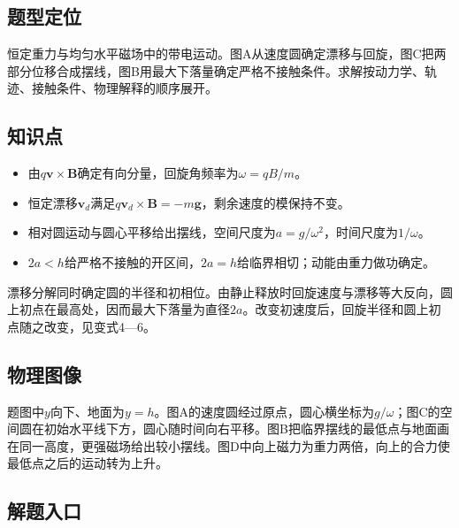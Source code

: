 \documentclass[UTF8,fontset=fandol,a4paper,11pt]{ctexart}
\begin{document}


\subsection*{题型定位}

恒定重力与均匀水平磁场中的带电运动。图A从速度圆确定漂移与回旋，图C把两部分位移合成摆线，图B用最大下落量确定严格不接触条件。求解按动力学、轨迹、接触条件、物理解释的顺序展开。



\subsection*{知识点}

\begin{itemize}
\item 由$q\boldsymbol v\times\boldsymbol B$确定有向分量，回旋角频率为$\omega=qB/m$。
\item 恒定漂移$\boldsymbol v_d$满足$q\boldsymbol v_d\times\boldsymbol B=-m\boldsymbol g$，剩余速度的模保持不变。
\item 相对圆运动与圆心平移给出摆线，空间尺度为$a=g/\omega^2$，时间尺度为$1/\omega$。
\item $2a<h$给严格不接触的开区间，$2a=h$给临界相切；动能由重力做功确定。
\end{itemize}
漂移分解同时确定圆的半径和初相位。由静止释放时回旋速度与漂移等大反向，圆上初点在最高处，因而最大下落量为直径$2a$。改变初速度后，回旋半径和圆上初点随之改变，见变式4—6。



\subsection*{物理图像}

题图中$y$向下、地面为$y=h$。图A的速度圆经过原点，圆心横坐标为$g/\omega$；图C的空间圆在初始水平线下方，圆心随时间向右平移。图B把临界摆线的最低点与地面画在同一高度，更强磁场给出较小摆线。图D中向上磁力为重力两倍，向上的合力使最低点之后的运动转为上升。



\subsection*{解题入口}
\end{document}
